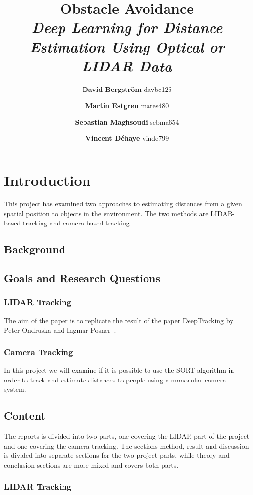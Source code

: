 \documentclass[a4paper]{article}
\title{\textbf{Obstacle Avoidance} \\
	\textit{Deep Learning for Distance Estimation Using Optical or LIDAR Data}}
\author{\textbf{David Bergström} davbe125 \and \textbf{Martin Estgren} mares480 \and
\textbf{Sebastian Maghsoudi} sebma654 \and \textbf{Vincent Déhaye} vinde799}
\begin{document}
\maketitle
\newpage

\section{Introduction}

This project has examined two approaches to estimating distances from a given spatial position to objects in the environment. The two methods are LIDAR-based tracking and camera-based tracking.

\subsection{Background}
\subsection{Goals and Research Questions}

\subsubsection{LIDAR Tracking}

The aim of the paper is to replicate the result of the paper DeepTracking by Peter Ondruska and Ingmar Posner~\cite{DBLP:journals/corr/OndruskaP16}.

\subsubsection{Camera Tracking}

In this project we will examine if it is possible to use the SORT algorithm in order to track and estimate distances to people using a monocular camera system.  

\subsection{Content}

The reports is divided into two parts, one covering the LIDAR part of the project and one covering the camera tracking.
The sections method, result and discussion is divided into separate sections for the two project parts, while theory and conclusion sections are more mixed and covers both parts.

\subsubsection{LIDAR Tracking}
\end{document}
